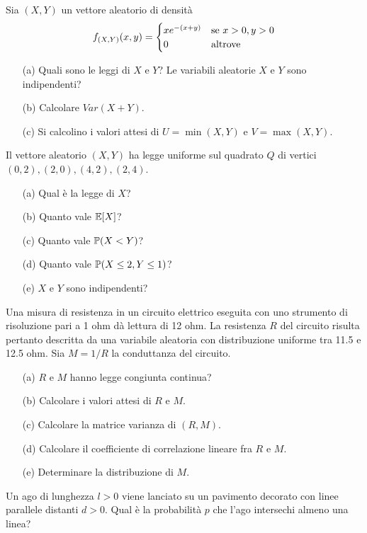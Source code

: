 \Esercizio{}
Sia $(X,Y)$ un vettore aleatorio di densità
\[
f_{(X,Y)}(x,y)=\begin{cases}
xe^{-(x+y)} &\text{se }x>0,y>0 \\
0 &\text{altrove}
\end{cases}
\]
\begin{enumerate}
\item [(a)] Quali sono le leggi di $X$ e $Y$? Le variabili aleatorie $X$ e $Y$ sono indipendenti?
\item [(b)] Calcolare $Var(X+Y)$.
\item [(c)] Si calcolino i valori attesi di $U=\min(X,Y)$ e $V=\max(X,Y)$.
\end{enumerate}

\Esercizio{}
Il vettore aleatorio $(X,Y)$ ha legge uniforme sul quadrato $Q$ di vertici $(0,2),(2,0),(4,2),(2,4)$.
\begin{enumerate}
\item [(a)] Qual è la legge di $X$?
\item [(b)] Quanto vale $\mathbb{E}[X]$?
\item [(c)] Quanto vale $\mathbb{P}(X<Y)$?
\item [(d)] Quanto vale $\mathbb{P}(X\leq 2,Y\leq 1)$?
\item [(e)] $X$ e $Y$ sono indipendenti?
\end{enumerate}

\Esercizio{}
Una misura di resistenza in un circuito elettrico eseguita con uno strumento di risoluzione pari a 1 ohm dà lettura di 12 ohm. La resistenza $R$ del circuito risulta pertanto descritta da una variabile aleatoria con distribuzione uniforme tra 11.5 e 12.5 ohm. Sia $M=1/R$ la conduttanza del circuito. 
\begin{enumerate}
\item [(a)] $R$ e $M$ hanno legge congiunta continua?
\item [(b)] Calcolare i valori attesi di $R$ e $M$.
\item [(c)] Calcolare la matrice varianza di $(R,M)$.
\item [(d)] Calcolare il coefficiente di correlazione lineare fra $R$ e $M$.
\item [(e)] Determinare la distribuzione di $M$.
\end{enumerate}

Un ago di lunghezza $l>0$ viene lanciato su un pavimento decorato con linee parallele distanti $d>0$. Qual è la probabilità $p$ che l'ago intersechi almeno una linea?

